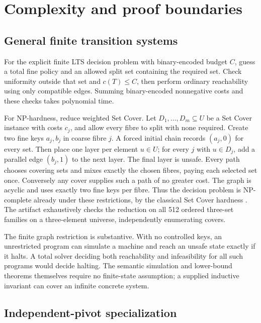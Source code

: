 \section{Complexity and proof
boundaries}\label{complexity-and-proof-boundaries}

\label{app:complexity}

\subsection{General finite transition
systems}\label{general-finite-transition-systems}

For the explicit finite LTS decision problem with binary-encoded budget
\(C\), guess a total fine policy and an allowed split set containing the
required set. Check uniformity outside that set and \(c(T)\le C\), then
perform ordinary reachability using only compatible edges. Summing
binary-encoded nonnegative costs and these checks takes polynomial time.

For NP-hardness, reduce weighted Set Cover. Let
\(D_1,\ldots,D_m\subseteq U\) be a Set Cover instance with costs
\(c_j\), and allow every fibre to split with none required. Create two
fine keys \(a_j,b_j\) in coarse fibre \(j\). A forced initial chain
records \((a_j,0)\) for every set. Then place one layer per element
\(u\in U\); for every \(j\) with \(u\in D_j\), add a parallel edge
\((b_j,1)\) to the next layer. The final layer is unsafe. Every path
chooses covering sets and mixes exactly the chosen fibres, paying each
selected set once. Conversely any cover supplies such a path of no
greater cost. The graph is acyclic and uses exactly two fine keys per
fibre. Thus the decision problem is NP-complete already under these
restrictions, by the classical Set Cover hardness
\cite{karp1972reducibility}. The artifact exhaustively checks the
reduction on all 512 ordered three-set families on a three-element
universe, independently enumerating covers.

The finite graph restriction is substantive. With no controlled keys, an
unrestricted program can simulate a machine and reach an unsafe state
exactly if it halts. A total solver deciding both reachability and
infeasibility for all such programs would decide halting. The semantic
simulation and lower-bound theorems themselves require no finite-state
assumption; a supplied inductive invariant can cover an infinite
concrete system.

\subsection{Independent-pivot
specialization}\label{independent-pivot-specialization}

